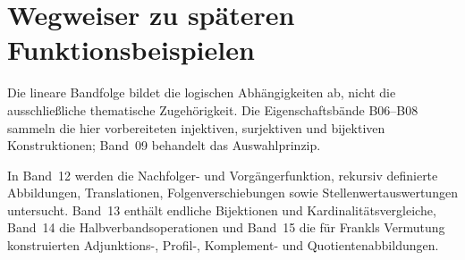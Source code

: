 \documentclass[main.tex]{subfiles}
\begin{document}
\chapter{Wegweiser zu späteren Funktionsbeispielen}

Die lineare Bandfolge bildet die logischen Abhängigkeiten ab, nicht die
ausschließliche thematische Zugehörigkeit. Die Eigenschaftsbände B06--B08
sammeln die hier vorbereiteten injektiven, surjektiven und bijektiven
Konstruktionen; Band~09 behandelt das Auswahlprinzip.

In Band~12 werden die Nachfolger- und Vorgängerfunktion, rekursiv definierte
Abbildungen, Translationen, Folgenverschiebungen sowie
Stellenwertauswertungen untersucht. Band~13 enthält endliche Bijektionen und
Kardinalitätsvergleiche, Band~14 die Halbverbandsoperationen und Band~15 die
für Frankls Vermutung konstruierten Adjunktions-, Profil-, Komplement- und
Quotientenabbildungen.
\end{document}
